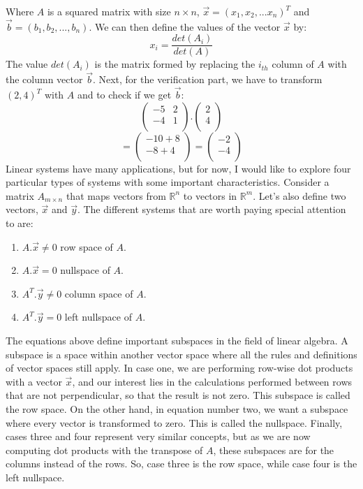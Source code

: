 \documentclass[600paper, 11pt,twoside,openany]{kdp}
\begin{document}
\indent Where $A$ is a squared matrix with size $n \times n$, $\overrightarrow{x} = (x_1,x_2,...x_n)^T$ and $\overrightarrow{b} = (b_1,b_2,...,b_n)$. We can then define the values of the vector $\overrightarrow{x}$ by:
\[x_i = \frac{det(A_i)}{det(A)}\]
\indent The value $det(A_i)$ is the matrix formed by replacing the $i_{th}$ column of $A$ with the column vector $\overrightarrow{b}$. Next, for the verification part, we have to transform $(2,4)^T$ with $A$ and to check if we get $\overrightarrow{b}$:
\[\begin{pmatrix}
-5 & 2  \\
-4 & 1 \\
\end{pmatrix}.\begin{pmatrix}
2  \\
4  \\
\end{pmatrix}\] 
\[ = \begin{pmatrix}
-10+8  \\
-8+4 \\
\end{pmatrix} = \begin{pmatrix}
-2  \\
-4 \\
\end{pmatrix}\]
\indent Linear systems have many applications, but for now, I would like to explore four particular types of systems with some important characteristics. Consider a matrix $A_{m \times n}$ that maps vectors from $\mathbb{R}^n$ to vectors in $\mathbb{R}^m$. Let’s also define two vectors, $\overrightarrow{x}$ and $\overrightarrow{y}$. The different systems that are worth paying special attention to are:
\vspace{5pt}
\begin{tcolorbox}
\begin{enumerate}
\item $A.\overrightarrow{x} \neq 0$ row space of $A$.
\item $A.\overrightarrow{x} = 0$ nullspace of $A$.
\item $A^T.\overrightarrow{y} \neq 0$ column space of $A$.
\item $A^T.\overrightarrow{y} = 0$ left nullspace of $A$.
\end{enumerate}
\end{tcolorbox}
\indent The equations above define important subspaces in the field of linear algebra. A subspace is a space within another vector space where all the rules and definitions of vector spaces still apply. In case one, we are performing row-wise dot products with a vector $\overrightarrow{x}$, and our interest lies in the calculations performed between rows that are not perpendicular, so that the result is not zero. This subspace is called the row space. On the other hand, in equation number two, we want a subspace where every vector is transformed to zero. This is called the nullspace. Finally, cases three and four represent very similar concepts, but as we are now computing dot products with the transpose of $A$, these subspaces are for the columns instead of the rows. So, case three is the row space, while case four is the left nullspace. 
\end{document}
